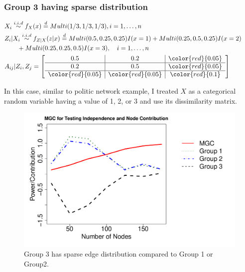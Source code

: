 \documentclass[12pt]{article}
\begin{document}
\subsubsection*{Group 3 having sparse distribution}
\begin{equation}
\label{eq:sim1}
\begin{gathered}
\begin{aligned}
&  X_{i} \overset{i.i.d}{\sim} f_{X}(x)   \stackrel{d}{=}  Multi(1/3, 1/3, 1/3), i = 1, \ldots , n \\ 
&  Z_{i} | X_{i}  \overset{i.i.d}{\sim}    f_{Z|X}(z|x)  \stackrel{d}{=}   Multi(0.5, 0.25, 0.25) I( x = 1 ) +   Multi(0.25, 0.5, 0.25) I (x = 2)  \qquad  \\ & \quad \quad + Multi(0.25, 0.25, 0.5)I(x = 3), \quad  i = 1,\ldots,n  \\
&  A_{ij} | Z_{i}, Z_{j}   = \left[ \begin{array}{c|c|c} 0.5 & 0.2 & \color{red}{0.05} \\ \hline 0.2 & 0.5 & \color{red}{0.05} \\ \hline \color{red}{0.05} & \color{red}{0.05} & \color{red}{0.1}   \end{array} \right]
\end{aligned}
\end{gathered}
\end{equation}

In this case, similar to politic network example, I treated $X$ as a categorical random variable having a value of 1, 2, or 3 and use its dissimilarity matrix.

\begin{figure}[h]
	\centering
	\includegraphics[width=\linewidth]{../../Figure/negcontri.pdf}	
	\caption{Group 3 has sparse edge distribution compared to Group 1 or Group2.}
	\label{fig:negcontri}
\end{figure}
\end{document}
